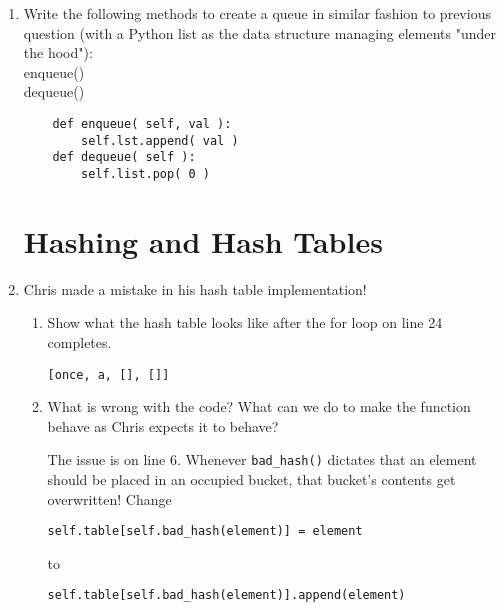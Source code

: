 \documentclass[11pt]{article}
\newenvironment{answer}{\large\lstset{basicstyle=\tiny\ttfamily}\color{white}}{}
\newenvironment{answer}{\large\lstset{basicstyle=\large\ttfamily}\color{red}}{}
\begin{document}
\begin{enumerate}
\item Write the following methods to create a queue in similar fashion to previous question (with a Python  list as the data structure managing elements "under the hood"):\\
	enqueue()\\
	dequeue()

	\begin{answer}
	 \begin{lstlisting}
	def enqueue( self, val ):
		self.lst.append( val )
	def dequeue( self ):
		self.list.pop( 0 )
	\end{lstlisting}
	\end{answer}

\pagebreak
\section*{Hashing and Hash Tables}

\item Chris made a mistake in his hash table implementation!

    
    \begin{enumerate}
    \item Show what the hash table looks like after the for loop on line 24
          completes. 

        \begin{answer}
		\begin{lstlisting}[numbers=none]
[once, a, [], []]
		\end{lstlisting}

        \end{answer}

    \item What is wrong with the code? What can we do to make the function behave as Chris expects it to behave?

        \begin{answer}
        The issue is on line 6. Whenever \texttt{bad\_hash()} dictates that an element should be placed in an occupied bucket, that bucket's contents get overwritten! Change 
\begin{lstlisting}[numbers=none]
self.table[self.bad_hash(element)] = element 
\end{lstlisting} to 
\begin{lstlisting}[numbers=none]
self.table[self.bad_hash(element)].append(element)
\end{lstlisting}

        \end{answer}


\end{enumerate}
\end{enumerate}
\end{document}
